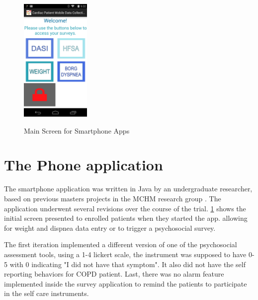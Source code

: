 \begin{figure}
 \begin{center}
  \label{fig:AndroidSplash}
  \includegraphics[scale=1,width=0.3\textwidth]{Images/AndroidSplash.png} 
  \caption{Main Screen for Smartphone Apps} 
 \end{center}
\end{figure}

\section{The Phone application}

The smartphone application was written in Java by an undergraduate researcher, based on previous masters projects in the MCHM research group \cite{Louro2013,Putin2011}. The application underwent several revisions over the course of the trial. \cref{fig:AndroidSplash} shows the initial screen presented to enrolled patients when they started the app. allowing for weight and dispnea data entry or to trigger a psychosocial survey.

The first iteration implemented a different version of one of the psychosocial assessment tools, using a 1-4 lickert scale, the instrument was supposed to have 0-5 with 0 indicating "I did not have that symptom". It also did not have the self reporting behaviors for COPD patient. Last, there was no alarm feature implemented inside the survey application to remind the patients to participate in the self care instruments.

